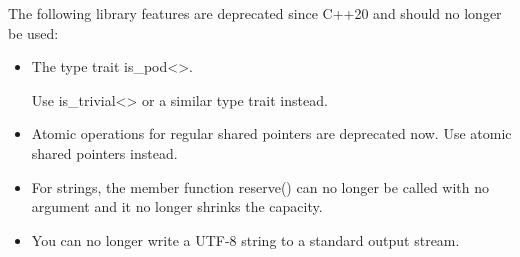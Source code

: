 



The following library features are deprecated since C++20 and should no longer be used:

\begin{itemize}
\item 
The type trait is\_pod<>.

Use is\_trivial<> or a similar type trait instead.

\item 
Atomic operations for regular shared pointers are deprecated now. Use atomic shared pointers instead.
\end{itemize}




\begin{itemize}
\item 
For strings, the member function reserve() can no longer be called with no argument and it no longer shrinks the capacity.

\item 
You can no longer write a UTF-8 string to a standard output stream.
\end{itemize}



